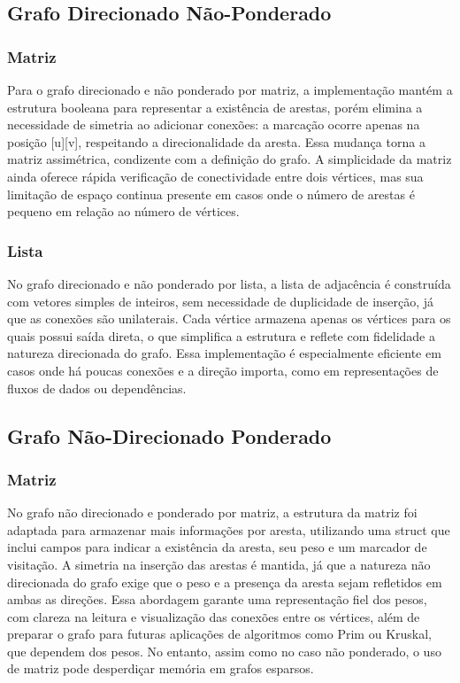 \documentclass{sbc2023}%
\begin{document}
\subsection{Grafo Direcionado Não-Ponderado}

\subsubsection {Matriz}
Para o grafo direcionado e não ponderado por matriz, a implementação mantém a estrutura booleana para representar a existência de arestas, porém elimina a necessidade de simetria ao adicionar conexões: a marcação ocorre apenas na posição [u][v], respeitando a direcionalidade da aresta. Essa mudança torna a matriz assimétrica, condizente com a definição do grafo. A simplicidade da matriz ainda oferece rápida verificação de conectividade entre dois vértices, mas sua limitação de espaço continua presente em casos onde o número de arestas é pequeno em relação ao número de vértices.
\subsubsection {Lista}
No grafo direcionado e não ponderado por lista, a lista de adjacência é construída com vetores simples de inteiros, sem necessidade de duplicidade de inserção, já que as conexões são unilaterais. Cada vértice armazena apenas os vértices para os quais possui saída direta, o que simplifica a estrutura e reflete com fidelidade a natureza direcionada do grafo. Essa implementação é especialmente eficiente em casos onde há poucas conexões e a direção importa, como em representações de fluxos de dados ou dependências.

\subsection{Grafo Não-Direcionado Ponderado}

\subsubsection {Matriz}
No grafo não direcionado e ponderado por matriz, a estrutura da matriz foi adaptada para armazenar mais informações por aresta, utilizando uma struct que inclui campos para indicar a existência da aresta, seu peso e um marcador de visitação. A simetria na inserção das arestas é mantida, já que a natureza não direcionada do grafo exige que o peso e a presença da aresta sejam refletidos em ambas as direções. Essa abordagem garante uma representação fiel dos pesos, com clareza na leitura e visualização das conexões entre os vértices, além de preparar o grafo para futuras aplicações de algoritmos como Prim ou Kruskal, que dependem dos pesos. No entanto, assim como no caso não ponderado, o uso de matriz pode desperdiçar memória em grafos esparsos.
\end{document}
